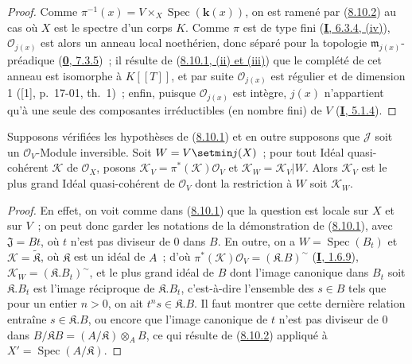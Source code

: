 \begin{proof}
Comme $\pi^{-1}(x)=V\times_X\operatorname{Spec}(\boldsymbol{k}(x))$, on est ramené par
(\hyperref[II.8.10.2-fr]{8.10.2}) au cas où $X$ est le spectre d'un corps
$K$. Comme $\pi$ est de type fini
(\hyperref[I.6.3.4-fr]{\textbf{I}, 6.3.4, (iv)}), $\mathcal{O}_{j(x)}$ est alors un
anneau local noethérien, donc séparé pour la topologie
$\mathfrak{m}_{j(x)}$-préadique
(\hyperref[0.7.3.5-fr]{\textbf{0}, 7.3.5})~; il résulte de
(\hyperref[II.8.10.1-fr]{8.10.1, (ii) et (iii)}) que le complété de cet anneau
est isomorphe à $K[[T]]$, et par suite $\mathcal{O}_{j(x)}$ est régulier et de
dimension 1 ([1], p.~17-01, th.~1)~; enfin, puisque $\mathcal{O}_{j(x)}$ est
intègre, $j(x)$ n'appartient qu'à une seule des composantes irréductibles (en
nombre fini) de $V$ (\hyperref[I.5.1.4-fr]{\textbf{I}, 5.1.4}).
\end{proof}

\begin{corollary}[8.10.4]
\label{II.8.10.4-fr}
Supposons vérifiées les hypothèses de (\hyperref[II.8.10.1-fr]{8.10.1}) et en
outre supposons que $\mathcal{J}$ soit un $\mathcal{O}_V$-Module inversible.
Soit $W=V\setmin j(X)$~; pour tout Idéal quasi-cohérent $\mathcal{K}$ de
$\mathcal{O}_X$, posons
$\mathcal{K}_V=\pi^*(\mathcal{K})\mathcal{O}_V$ et
$\mathcal{K}_W=\mathcal{K}_V|W$. Alors $\mathcal{K}_V$ est le plus grand
Idéal quasi-cohérent de $\mathcal{O}_V$ dont la restriction à $W$ soit
$\mathcal{K}_W$.
\end{corollary}

\begin{proof}
En effet, on voit comme dans (\hyperref[II.8.10.1-fr]{8.10.1}) que la question
est locale sur $X$ et sur $V$~; on peut donc garder les notations de la
démonstration de (\hyperref[II.8.10.1-fr]{8.10.1}), avec
$\mathfrak{J}=Bt$, où $t$ n'est pas diviseur de 0 dans $B$. En outre, on a
$W=\operatorname{Spec}(B_t)$ et $\mathcal{K}=\widetilde{\mathfrak{K}}$, où
$\mathfrak{K}$ est un idéal de $A$~; d'où
$\pi^*(\mathcal{K})\mathcal{O}_V=(\mathfrak{K}.B)^{\sim}$
(\hyperref[I.1.6.9-fr]{\textbf{I}, 1.6.9}),
$\mathcal{K}_W=(\mathfrak{K}.B_t)^{\sim}$, et le plus grand idéal
de $B$ dont l'image canonique dans $B_t$ soit $\mathfrak{K}.B_t$ est l'image
réciproque de $\mathfrak{K}.B_t$, c'est-à-dire l'ensemble des $s\in B$ tels
que pour un entier $n>0$, on ait $t^ns\in\mathfrak{K}.B$. Il faut montrer que
cette dernière relation entraîne $s\in\mathfrak{K}.B$, ou encore que l'image
canonique de $t$ n'est pas diviseur de 0 dans
$B/\mathfrak{K}B=(A/\mathfrak{K})\otimes_A B$, ce qui résulte de
(\hyperref[II.8.10.2-fr]{8.10.2}) appliqué à
$X'=\operatorname{Spec}(A/\mathfrak{K})$.
\end{proof}

